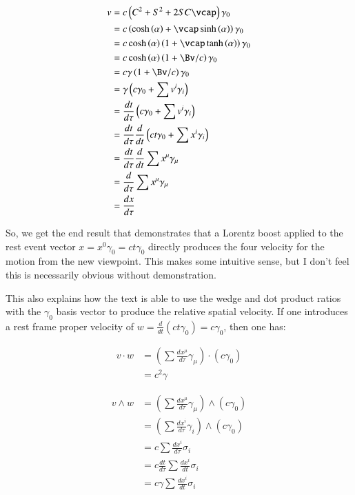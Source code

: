 \begin{align*}
v
&= c \left( C^2 + S^2 + 2 SC \vcap \right) \gamma_0 \\
&= c \left( \cosh\left(\alpha\right) + \vcap \sinh\left(\alpha\right) \right) \gamma_0 \\
&= c \cosh\left(\alpha\right) \left( 1 + \vcap \tanh\left(\alpha\right) \right) \gamma_0 \\
&= c \cosh\left(\alpha\right) \left( 1 + \Bv/c \right) \gamma_0 \\
&= c \gamma \left( 1 + \Bv/c \right) \gamma_0 \\
&= \gamma \left( c \gamma_0 + \sum v^i \gamma_i\right) \\
&= \frac{dt}{d\tau}\left( c \gamma_0 + \sum v^i \gamma_i\right) \\
&= \frac{dt}{d\tau} \frac{d}{dt}\left( c t \gamma_0 + \sum x^i \gamma_i\right) \\
&= \frac{dt}{d\tau} \frac{d}{dt} \sum x^{\mu} \gamma_{\mu} \\
&= \frac{d}{d\tau} \sum x^{\mu} \gamma_{\mu} \\
&= \frac{dx}{d\tau}
\end{align*}

So, we get the end result that demonstrates that a Lorentz boost applied to the rest event vector $x = x^0 \gamma_0 = c t \gamma_0$ directly produces the four velocity for the motion from the new viewpoint.  This makes some intuitive sense, but
I don't feel this is necessarily obvious without demonstration.

This also explains how the text is able to use the wedge and dot product ratios with the $\gamma_0$ basis vector
to produce the relative spatial velocity.  If one introduces a rest frame proper velocity of
$w = \frac{d}{dt}\left(ct \gamma_0\right) = c \gamma_0$, then one has:

\begin{align*}
v \cdot w 
&= \left(\sum \frac{d x^{\mu}}{d\tau} \gamma_{\mu}\right) \cdot \left(c\gamma_0\right) \\
&= c^2 \gamma
\end{align*}

\begin{align*}
v \wedge w 
&= \left(\sum \frac{d x^{\mu}}{d\tau} \gamma_{\mu}\right) \wedge \left(c\gamma_0\right) \\
&= \left(\sum \frac{d x^{i}}{d\tau} \gamma_{i}\right) \wedge \left(c\gamma_0\right) \\
&= c \sum \frac{d x^{i}}{d\tau} \sigma_{i} \\
&= c \frac{dt}{d\tau} \sum \frac{d x^{i}}{dt} \sigma_{i} \\
&= c \gamma \sum \frac{d x^{i}}{dt} \sigma_{i} \\
\end{align*}

